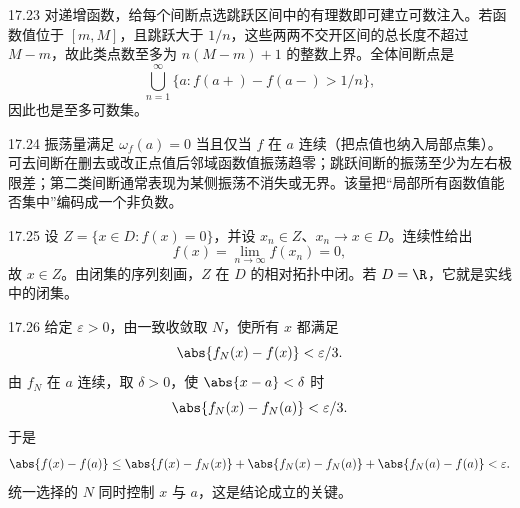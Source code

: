 \begin{solution}{17.23}
对递增函数，给每个间断点选跳跃区间中的有理数即可建立可数注入。若函数值位于 \([m,M]\)，且跳跃大于 \(1/n\)，这些两两不交开区间的总长度不超过 \(M-m\)，故此类点数至多为 \(n(M-m)+1\) 的整数上界。全体间断点是
\[
 \bigcup_{n=1}^{\infty}\{a:f(a+)-f(a-)>1/n\},
\]
因此也是至多可数集。
\end{solution}

\begin{solution}{17.24}
振荡量满足 \(\omega_f(a)=0\) 当且仅当 \(f\) 在 \(a\) 连续（把点值也纳入局部点集）。可去间断在删去或改正点值后邻域函数值振荡趋零；跳跃间断的振荡至少为左右极限差；第二类间断通常表现为某侧振荡不消失或无界。该量把“局部所有函数值能否集中”编码成一个非负数。
\end{solution}

\begin{solution}{17.25}
设 \(Z=\{x\in D:f(x)=0\}\)，并设 \(x_n\in Z\)、\(x_n\to x\in D\)。连续性给出
\[
 f(x)=\lim_{n\to\infty}f(x_n)=0,
\]
故 \(x\in Z\)。由闭集的序列刻画，\(Z\) 在 \(D\) 的相对拓扑中闭。若 \(D=\R\)，它就是实线中的闭集。
\end{solution}

\begin{solution}{17.26}
给定 \(\varepsilon>0\)，由一致收敛取 \(N\)，使所有 \(x\) 都满足
\[
 \abs{f_N(x)-f(x)}<\varepsilon/3.
\]
由 \(f_N\) 在 \(a\) 连续，取 \(\delta>0\)，使 \(\abs{x-a}<\delta\) 时
\[
 \abs{f_N(x)-f_N(a)}<\varepsilon/3.
\]
于是
\[
 \abs{f(x)-f(a)}
 \le\abs{f(x)-f_N(x)}
 +\abs{f_N(x)-f_N(a)}
 +\abs{f_N(a)-f(a)}
 <\varepsilon.
\]
统一选择的 \(N\) 同时控制 \(x\) 与 \(a\)，这是结论成立的关键。
\end{solution}
